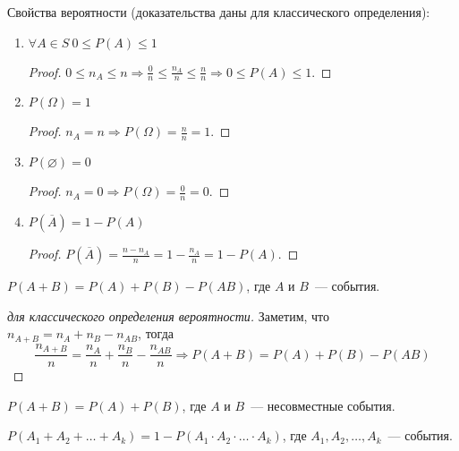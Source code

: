 Свойства вероятности (доказательства даны для классического определения):
\begin{enumerate}
	\item $\forall A \in S \ 0 \leqslant P(A) \leqslant 1$
	\begin{proof}
	$0 \leqslant n_A \leqslant n \Rightarrow
	\frac0n \leqslant \frac{n_A}n \leqslant \frac{n}n \Rightarrow
	0 \leqslant P(A) \leqslant 1$.
	\end{proof}
	
	\item $P(\Omega) = 1$
	\begin{proof}
	$n_A = n \Rightarrow P(\Omega) = \frac{n}n = 1$.
	\end{proof}
	
	\item $P(\varnothing) = 0$
	\begin{proof}
	$n_A = 0 \Rightarrow P(\Omega) = \frac0n = 0$.
	\end{proof}
	
	\item $P(\overline A) = 1 - P(A)$
	\begin{proof}
	$P(\overline A) = \frac{n - n_A}n = 1 - \frac{n_A}n = 1 - P(A)$.
	\end{proof}
\end{enumerate}

\begin{theorem}
$P(A + B) = P(A) + P(B) - P(AB)$, где $A$ и $B$~--- события.
\end{theorem}
\begin{proof}[для классического определения вероятности]
Заметим, что $n_{A + B} = n_A + n_B - n_{AB}$, тогда
\begin{equation*}
\frac{n_{A + B}}n = \frac{n_A}n + \frac{n_B}n - \frac{n_{AB}}n \Rightarrow
P(A + B) = P(A) + P(B) - P(AB)
\end{equation*}
\end{proof}

\begin{consequent}
$P(A + B) = P(A) + P(B)$, где $A$ и $B$~--- несовместные события.
\end{consequent}

\begin{theorem}
$P(A_1 + A_2 + \ldots + A_k) = 1 - P(A_1 \cdot A_2 \cdot \ldots \cdot A_k)$, где $A_1, A_2, \ldots, A_k$~--- события.
\end{theorem}